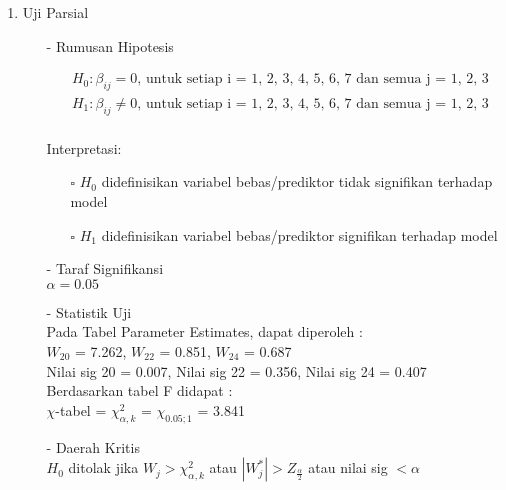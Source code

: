 \begin{enumerate}
    \item Uji Parsial
    \begin{test}{
    \begin{enumerate}
        \item[-] Rumusan Hipotesis \\
        \begin{fleqn}[\parindent]
            \begin{equation*}
            \begin{split}
            &H_0 : \beta_{ij} = 0 \text{, untuk setiap i = 1, 2, 3, 4, 5, 6, 7 dan semua j = 1, 2, 3} \\ 
            &H_1 : \beta_{ij} \neq 0 \text{, untuk setiap i = 1, 2, 3, 4, 5, 6, 7 dan semua j = 1, 2, 3} \\
            \end{split}
            \end{equation*}
        \end{fleqn}
        Interpretasi:
        \begin{enumerate}
        \item[$\square$] $H_0$ didefinisikan variabel bebas/prediktor tidak signifikan terhadap model
        \item[$\square$] $H_1$ didefinisikan variabel bebas/prediktor signifikan terhadap model
        \end{enumerate}
    
        \item[-] Taraf Signifikansi \\
        $\alpha = 0.05$
    
        \item[-] Statistik Uji \\
        Pada Tabel Parameter Estimates, dapat diperoleh : \\
        $W_{20}$ = 7.262, $W_{22}$ = 0.851, $W_{24}$ = 0.687 
        \\ Nilai sig 20 = 0.007, Nilai sig 22 = 0.356, Nilai sig 24 = 0.407 \\
        Berdasarkan tabel F didapat : \\
        $\chi$-tabel = $\chi_{\alpha, k}^2$ = $\chi_{0.05; 1}$ = 3.841
    
        \item[-] Daerah Kritis \\
        $H_0$ ditolak jika $W_j > \chi_{\alpha, k}^2$ atau $|W_j^*| > Z_{\frac{\alpha}{2}}$ atau nilai sig $< \alpha$
    

\end{enumerate}}
\end{test}
\end{enumerate}
